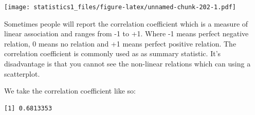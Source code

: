 \documentclass[]{article}
\newenvironment{Shaded}{\begin{snugshade}}{\end{snugshade}}
\newcommand{\KeywordTok}[1]{\textcolor[rgb]{0.13,0.29,0.53}{\textbf{#1}}}
\newcommand{\DataTypeTok}[1]{\textcolor[rgb]{0.13,0.29,0.53}{#1}}
\newcommand{\DecValTok}[1]{\textcolor[rgb]{0.00,0.00,0.81}{#1}}
\newcommand{\StringTok}[1]{\textcolor[rgb]{0.31,0.60,0.02}{#1}}
\newcommand{\CommentTok}[1]{\textcolor[rgb]{0.56,0.35,0.01}{\textit{#1}}}
\newcommand{\OtherTok}[1]{\textcolor[rgb]{0.56,0.35,0.01}{#1}}
\newcommand{\OperatorTok}[1]{\textcolor[rgb]{0.81,0.36,0.00}{\textbf{#1}}}
\newcommand{\NormalTok}[1]{#1}
\theoremstyle{definition}
\theoremstyle{definition}
\theoremstyle{definition}
\theoremstyle{remark}
\begin{document}
\begin{Shaded}
\end{Shaded}

\texttt{[image: statistics1\_files/figure-latex/unnamed-chunk-202-1.pdf]}

Sometimes people will report the correlation coefficient which is a
measure of linear association and ranges from -1 to +1. Where -1 means
perfect negative relation, 0 means no relation and +1 means perfect
positive relation. The correlation coefficient is commonly used as as
summary statistic. It's disadvantage is that you cannot see the
non-linear relations which can using a scatterplot.

We take the correlation coefficient like so:

\begin{Shaded}
\end{Shaded}

\begin{verbatim}
[1] 0.6813353
\end{verbatim}
\end{document}
